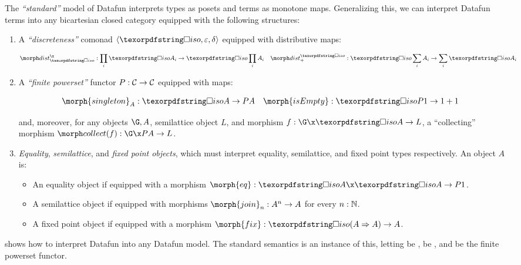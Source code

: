 \documentclass{rntz}\usepackage{fantasy}%
\begin{document}
The \emph{``standard''} model of Datafun interprets types as posets and terms as
monotone maps. Generalizing this, we can interpret Datafun terms into any
bicartesian closed category \catC{} equipped with the following structures:

\begin{enumerate}
\item A \emph{``discreteness''} comonad $\tuple{\disco{}, \varepsilon, \delta}$
  equipped with distributive maps:

  \nopagebreak[2]
  \begin{align*}
    \discox &: \prod_i \discof{A_i} \to \disco \prod_i A_i
    &
    \discosum &: \disco \sum_i A_i \to \sum_i \discof{A_i}
  \end{align*}

\item A \emph{``finite powerset''} functor \(P : \mathcal{C} \to \mathcal{C}\) equipped
  with maps:

  \nopagebreak[2]
  \begin{align*}
    \morph{singleton}_A &: \isof A \to \pfinof{A} &
    \morph{isEmpty} &: \discof{\pfinof{\termO}} \to \termO + \termO
  \end{align*}

  \noindent
  and, moreover, for any objects $\G,A$, semilattice object $L$, and morphism $f
  : \G \x \isof A \to L$, a ``collecting'' morphism \( \pcollect{f} : \G \x
  \pfinof A \to L \).

\item \emph{Equality}, \emph{semilattice}, and \emph{fixed point objects}, which
  must interpret equality, semilattice, and fixed point types respectively. An
  object $A$ is:
%
  \begin{itemize}
  \item An equality object if equipped with a morphism $\morph{eq} : \discof A
    \x \discof A \to \pfinof \termO$.

  \item A semilattice object if equipped with morphisms $\morph{join}_n : A^n
    \to A$ for every $n : \mathbb{N}$.

  \item A fixed point object if equipped with a morphism $\morph{fix} :
    \discof{(\expO A A)} \to A$.
  \end{itemize}

\end{enumerate}

\noindent
{} shows how to interpret Datafun into any Datafun
model. The standard semantics is an instance of this, letting \catC{} be
\Poset{}, \iso{} be \iso{}, and \pfin{} be the finite powerset functor.
\end{document}
